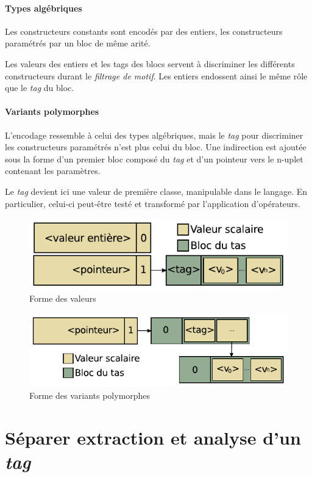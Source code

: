 \paragraph{Types algébriques} Les constructeurs constants sont encodés par des
entiers, les constructeurs paramétrés par un bloc de même arité.

Les valeurs des entiers et les tags des blocs servent à discriminer les
différents constructeurs durant le \emph{filtrage de motif}. Les entiers
endossent ainsi le même rôle que le \emph{tag} du bloc.
 
\paragraph{Variants polymorphes} L'encodage ressemble à celui des types
algébriques, mais le \emph{tag} pour discriminer les constructeurs paramétrés
n'est plus celui du bloc. Une indirection est ajoutée sous la forme d'un
premier bloc composé du \emph{tag} et d'un pointeur vers le n-uplet contenant
les paramètres.

Le \emph{tag} devient ici une valeur de première classe, manipulable dans le
langage.  En particulier, celui-ci peut-être testé et transformé par
l'application d'opérateurs.

\begin{figure}
\centering
\includegraphics{media/ocaml_value}
\caption{Forme des valeurs}
\end{figure}

\begin{figure}
\centering
\includegraphics{media/ocaml_variant}
\caption{Forme des variants polymorphes}
\end{figure}

\section{Séparer extraction et analyse d'un \emph{tag}}

